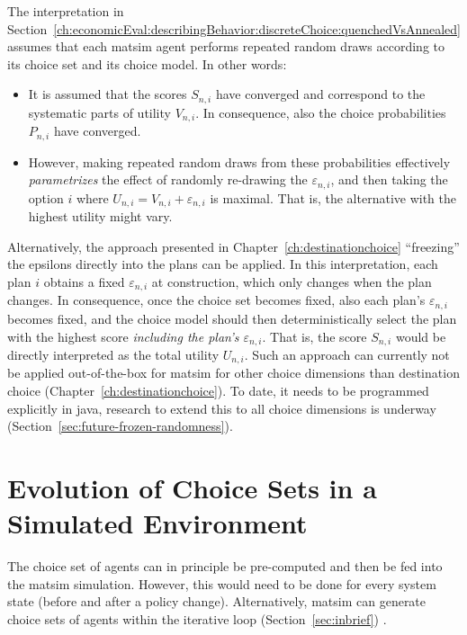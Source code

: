 The interpretation in Section~\ref{ch:economicEval:describingBehavior:discreteChoice:quenchedVsAnnealed} assumes that each \acrshort{matsim} agent performs repeated random draws according to its choice set and its choice model. 
%
In other words:
%
\begin{itemize}\styleItemize
\item It is assumed that the scores $S_{n,i}$ have converged and correspond to the systematic parts of utility $V_{n,i}$. In consequence, also the choice probabilities $P_{n,i}$ have converged.
%
\item However, making repeated random draws from these probabilities effectively \emph{parametrizes} the effect of randomly re-drawing the $\varepsilon_{n,i}$, and then taking the option $i$ where $U_{n,i} = V_{n,i} + \varepsilon_{n,i}$ is maximal. That is, the alternative with the highest utility might vary.
\end{itemize}
%

Alternatively, the approach presented in Chapter~\ref{ch:destinationchoice} ``freezing'' the epsilons directly into the plans can be applied.  
In this interpretation, each plan $i$ obtains a fixed $\varepsilon_{n,i}$ at construction, which only changes when the plan changes. 
In consequence, once the choice set becomes fixed, also each plan's $\varepsilon_{n,i}$ becomes fixed, and the choice model should then deterministically select the plan with the highest score \emph{including the plan's $\varepsilon_{n,i}$}.
That is, the score $S_{n,i}$ would be directly interpreted as the total utility $U_{n,i}$.
Such an approach can currently not be applied out-of-the-box for \acrshort{matsim} for other choice dimensions than destination choice (Chapter~\ref{ch:destinationchoice}).
To date, it needs to be programmed explicitly in \gls{java}, research to extend this to all choice dimensions is underway (Section~\ref{sec:future-frozen-randomness}). 




\section{Evolution of Choice Sets in a Simulated
Environment}
\label{sec:Evolution-of-choice}

The choice set of agents can in principle be pre-computed and then be fed into the \acrshort{matsim} simulation. However, this would need to be done for every system state (\eg before and after a policy change).
%
Alternatively, \acrshort{matsim} can generate choice sets of agents within the iterative loop (Section~\ref{sec:inbrief})
%
%
.

